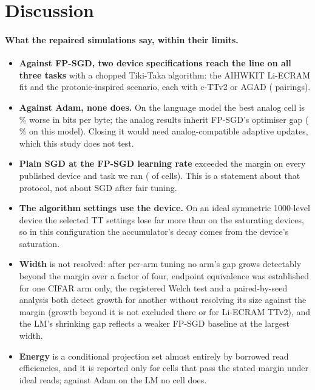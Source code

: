 \section{Discussion}\label{sec:discussion}
\paragraph{What the repaired simulations say, within their limits.}
\begin{itemize}
\item \textbf{Against FP-SGD, two device specifications reach the line on all three tasks} with a chopped Tiki-Taka algorithm:
      the AIHWKIT Li-ECRAM fit and the protonic-inspired scenario, each with c-TTv2 or AGAD (\RVAllThreeFpN{} pairings).
\item \textbf{Against Adam, none does.} On the language model the best analog cell is \RVLmAdamBestGap\,\% worse in bits per
      byte; the analog results inherit FP-SGD's optimiser gap (\RVLmFpSgdVsAdamPct\,\% on this model). Closing it would need
      analog-compatible adaptive updates, which this study does not test.
\item \textbf{Plain SGD at the FP-SGD learning rate} exceeded the margin on every published device and task we ran
      (\RVSgdPubFail{} of \RVSgdPubN{} cells). This is a statement about that protocol, not about SGD after fair tuning.
\item \textbf{The algorithm settings use the device.} On an ideal symmetric 1000-level device the selected TT settings lose
      far more than on the saturating devices, so in this configuration the accumulator's decay comes from the device's
      saturation.
\item \textbf{Width} is not resolved: after per-arm tuning no arm's gap grows detectably beyond the margin over a factor of
      four, endpoint equivalence was established for one CIFAR arm only, the registered Welch test and a paired-by-seed analysis both detect growth for
      another without resolving its size against the margin (growth beyond it is not excluded there or for
      Li-ECRAM TTv2), and the LM's shrinking gap reflects a weaker FP-SGD baseline at the largest width.
\item \textbf{Energy} is a conditional projection set almost entirely by borrowed read efficiencies, and it is reported only
      for cells that pass the stated margin under ideal reads; against Adam on the LM no cell does.
\end{itemize}

